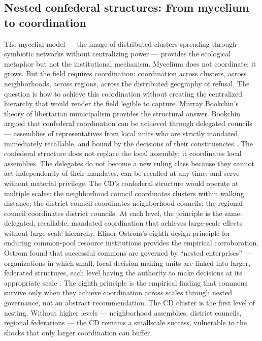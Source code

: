 \subsection{Nested confederal structures: From mycelium to coordination}

The mycelial model — the image of distributed clusters spreading through symbiotic networks without centralizing power — provides the ecological metaphor but not the institutional mechanism. Mycelium does not coordinate; it grows. But the field requires coordination: coordination across clusters, across neighborhoods, across regions, across the distributed geography of refusal. The question is how to achieve this coordination without creating the centralized hierarchy that would render the field legible to capture. Murray Bookchin’s theory of libertarian municipalism provides the structural answer. Bookchin argued that confederal coordination can be achieved through delegated councils — assemblies of representatives from local units who are strictly mandated, immediately recallable, and bound by the decisions of their constituencies \cite{bookchin_1991}. The confederal structure does not replace the local assembly; it coordinates local assemblies. The delegates do not become a new ruling class because they cannot act independently of their mandates, can be recalled at any time, and serve without material privilege. The CD’s confederal structure would operate at multiple scales: the neighborhood council coordinates clusters within walking distance; the district council coordinates neighborhood councils; the regional council coordinates district councils. At each level, the principle is the same: delegated, recallable, mandated coordination that achieves large-scale effects without large-scale hierarchy. Elinor Ostrom’s eighth design principle for enduring common-pool resource institutions provides the empirical corroboration. Ostrom found that successful commons are governed by “nested enterprises” — organizations in which small, local decision-making units are linked into larger, federated structures, each level having the authority to make decisions at its appropriate scale \cite{ostrom_1990}. The eighth principle is the empirical finding that commons survive only when they achieve coordination across scales through nested governance, not an abstract recommendation. The CD cluster is the first level of nesting. Without higher levels — neighborhood assemblies, district councils, regional federations — the CD remains a smallscale success, vulnerable to the shocks that only larger coordination can buffer.

